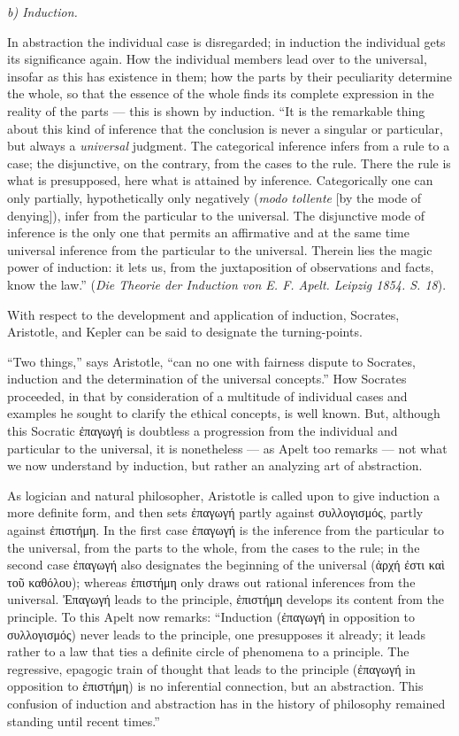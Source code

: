 \documentclass[12pt]{book}
\begin{document}
\emph{b) Induction.}

In abstraction the individual case is disregarded; in induction the individual gets
its significance again. How the individual members lead over to the universal,
insofar as this has existence in them; how the parts by their peculiarity determine
the whole, so that the essence of the whole finds its complete expression in the
reality of the parts — this is shown by induction. ``It is the remarkable thing
about this kind of inference that the conclusion is never a singular or particular,
but always a \emph{universal} judgment. The categorical inference infers from a
rule to a case; the disjunctive, on the contrary, from the cases to the rule. There
the rule is what is presupposed, here what is attained by inference. Categorically
one can only partially, hypothetically only negatively (\textit{modo tollente} [by
the mode of denying]), infer from the particular to the universal. The disjunctive
mode of inference is the only one that permits an affirmative and at the same time
universal inference from the particular to the universal. Therein lies the magic
power of induction: it lets us, from the juxtaposition of observations and facts,
know the law.'' (\textit{Die Theorie der Induction von E. F. Apelt. Leipzig 1854. S.
18}).

With respect to the development and application of induction, Socrates, Aristotle,
and Kepler can be said to designate the turning-points.

``Two things,'' says Aristotle, ``can no one with fairness dispute to Socrates,
induction and the determination of the universal concepts.'' How Socrates
proceeded, in that by consideration of a multitude of individual cases and
examples he sought to clarify the ethical concepts, is well known. But, although
this Socratic ἐπαγωγή is doubtless a progression from the individual and particular
to the universal, it is nonetheless — as Apelt too remarks — not what we now
understand by induction, but rather an analyzing art of abstraction.

As logician and natural philosopher, Aristotle is called upon to give induction a
more definite form, and then sets ἐπαγωγή partly against συλλογισμός, partly against
ἐπιστήμη. In the first case ἐπαγωγή is the inference from the particular to the
universal, from the parts to the whole, from the cases to the rule; in the second
case ἐπαγωγή also designates the beginning of the universal (ἀρχή ἐστι καὶ τοῦ
καθόλου); whereas ἐπιστήμη only draws out rational inferences from the universal.
Ἐπαγωγή leads to the principle, ἐπιστήμη develops its content from the principle. To
this Apelt now remarks: ``Induction (ἐπαγωγή in opposition to συλλογισμός) never
leads to the principle, one presupposes it already; it leads rather to a law that
ties a definite circle of phenomena to a principle. The regressive, epagogic train
of thought that leads to the principle (ἐπαγωγή in opposition to ἐπιστήμη) is no
inferential connection, but an abstraction. This confusion of induction and
abstraction has in the history of philosophy remained standing until recent
times.''
\end{document}
